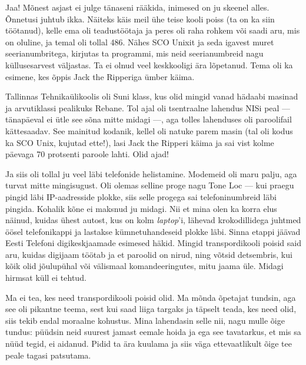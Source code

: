 
Jaa! Mõnest asjast ei julge tänaseni rääkida, inimesed on ju skeenel 
alles. Õnnetusi juhtub ikka. Näiteks käis meil ühe teise kooli poiss (ta on 
ka siin 
töötanud), kelle ema oli teadustöötaja ja peres oli raha rohkem või saadi aru, mis on 
oluline, ja temal oli tollal 486. Nähes SCO Unixit ja seda igavest 
muret seerianumbritega, kirjutas ta programmi, mis neid 
seerianumbreid nagu küllusesarvest väljastas. Ta ei olnud veel keskkooligi ära 
lõpetanud. Tema oli ka esimene, kes õppis Jack the Ripperiga ümber käima. 

Tallinnas Tehnikaülikoolis oli Suni klass, kus olid 
mingid vanad hädaabi masinad ja arvutiklassi pealikuks Rebane. Tol ajal oli
tsentraalne lahendus NISi peal --- tänapäeval ei ütle see sõna mitte midagi ---, 
aga tolles lahenduses oli paroolifail kättesaadav. See mainitud
kodanik, kellel oli natuke parem masin (tal oli kodus ka SCO 
Unix, kujutad ette!), lasi Jack the Ripperi käima ja sai vist kolme päevaga 70 protsenti paroole lahti. Olid ajad!

Ja siis oli tollal ju veel läbi telefonide helistamine. Modemeid oli maru palju, aga 
turvat mitte mingisugust. Oli olemas selline proge nagu Tone Loc --- kui praegu pingid 
läbi IP-aadresside plokke, siis selle progega sai telefoninumbreid läbi pingida. Kohalik kõne ei maksnud ju midagi. Nii et mina 
olen ka korra elus näinud, kuidas ühest autost, kus on kolm \emph{laptop}'i, 
lähevad krokodillidega juhtmed öösel telefonikappi ja lastakse kümnetuhandeseid 
plokke läbi. Sinna etappi jäävad Eesti Telefoni digikeskjaamade esimesed 
häkid. Mingid transpordikooli poisid said aru, kuidas digijaam töötab ja et paroolid on nirud, ning võtsid detsembris, kui kõik olid jõulupühal või 
välismaal komandeeringutes, mitu jaama üle. Midagi hirmsat küll ei tehtud. 


Ma ei tea, kes need transpordikooli poisid olid. Ma mõnda õpetajat 
tundsin, aga see oli pikantne teema, sest kui saad liiga 
targaks ja täpselt teada, kes need olid, siis 
tekib endal moraalne kohustus. Mina lahendasin selle nii, nagu mulle õige 
tundus: püüdsin neid suurest jamast eemale hoida ja ega see tavatarkus, 
et mis sa nüüd tegid, ei aidanud. Pidid ta ära kuulama ja 
siis väga ettevaatlikult õige tee peale tagasi patsutama. 

